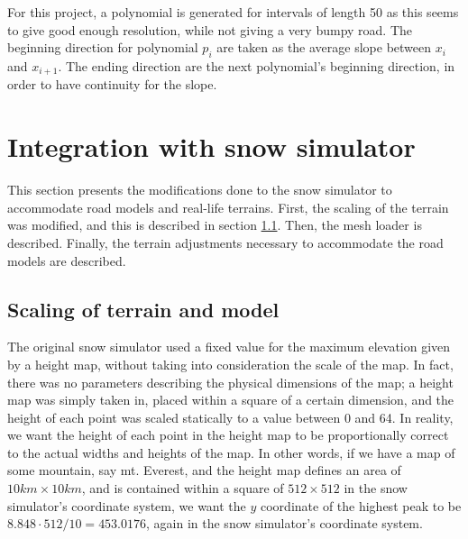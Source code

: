For this project, a polynomial is generated for intervals of length 50 as this seems to give good enough resolution, while not giving a very bumpy road. The beginning direction for polynomial $p_i$ are taken as the average slope between $x_i$ and $x_{i+1}$. The ending direction are the next polynomial's beginning direction, in order to have continuity for the slope.


\section{Integration with snow simulator}
\label{sec:impl_snowsim}
This section presents the modifications done to the snow simulator to accommodate road models and real-life terrains. First, the scaling of the terrain was modified, and this is described in section \ref{sec:terrain_scaling}. Then, the mesh loader is described. Finally, the terrain adjustments necessary to accommodate the road models are described.

\subsection{Scaling of terrain and model}
\label{sec:terrain_scaling}
The original snow simulator used a fixed value for the maximum elevation given by a height map, without taking into consideration the scale of the map. In fact, there was no parameters describing the physical dimensions of the map; a height map was simply taken in, placed within a square of a certain dimension, and the height of each point was scaled statically to a value between 0 and 64. In reality, we want the height of each point in the height map to be proportionally correct to the actual widths and heights of the map. In other words, if we have a map of some mountain, say mt. Everest, and the height map defines an area of $10km\times 10km$, and is contained within a square of $512\times 512$ in the snow simulator's coordinate system, we want the $y$ coordinate of the highest peak to be $8.848\cdot 512/10 = 453.0176$, again in the snow simulator's coordinate system.


